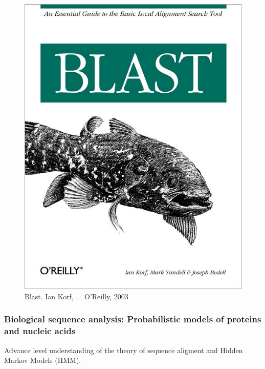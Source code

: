 \documentclass[]{book}
\theoremstyle{definition}
\theoremstyle{definition}
\theoremstyle{definition}
\theoremstyle{remark}
\begin{document}
\begin{figure}
\includegraphics[width=6.94in]{pic/blast_book} \caption{Blast. Ian Korf, ... O'Reilly, 2003}\label{fig:unnamed-chunk-10}
\end{figure}

\hypertarget{biological-sequence-analysis-probabilistic-models-of-proteins-and-nucleic-acids}{\subsubsection*{Biological
sequence analysis: Probabilistic models of proteins and nucleic
acids}\label{biological-sequence-analysis-probabilistic-models-of-proteins-and-nucleic-acids}}

Advance level understanding of the theory of sequence aligment and
Hidden Markov Models (HMM).
\end{document}
